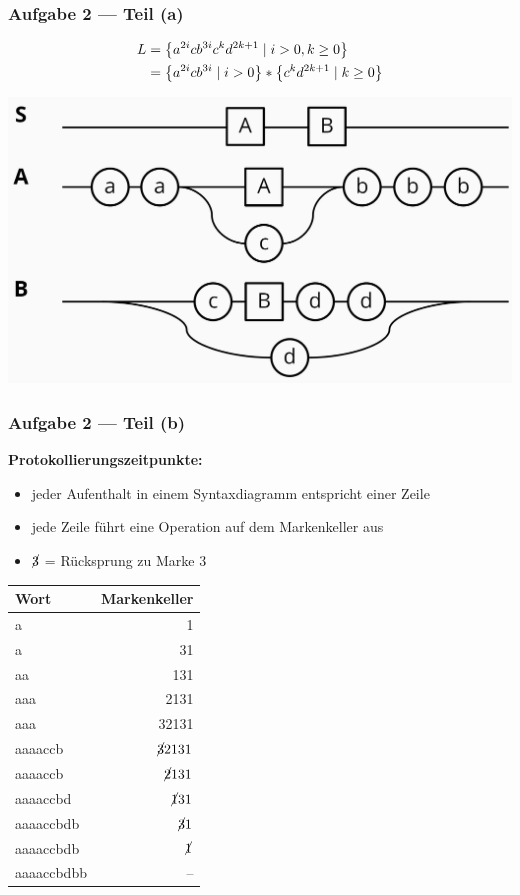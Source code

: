 \documentclass{beamer}
\begin{document}
\begin{frame} \frametitle{Aufgabe 2 --- Teil (a)}
	\begin{align*}
		L &= \left\{ a^{2i} c b^{3i} c^k d^{2k+1} \mid i > 0, k \ge 0 \right\} \\
		&= \left\{ a^{2i} c b^{3i} \mid i > 0 \right\} * \left\{ c^k d^{2k+1} \mid k \ge 0 \right\}
	\end{align*}
	
	\centering
	\includegraphics[width=.9\textwidth]{tut02_syntax_dia_2a.jpg}
\end{frame}

\begin{frame} \frametitle{Aufgabe 2 --- Teil (b)}
	\begin{minipage}{\dimexpr0.5\linewidth-\fboxrule-\fboxsep}
		\small
		\textbf{Protokollierungszeitpunkte:}
		\begin{itemize}
			\item jeder Aufenthalt in einem Syntaxdiagramm entspricht einer Zeile
			\item jede Zeile führt eine Operation auf dem Markenkeller aus
			\item $\cancel{3}$ = Rücksprung zu Marke $3$
		\end{itemize}
	\end{minipage}
	\pause
	\begin{minipage}{\dimexpr0.5\linewidth-\fboxrule-\fboxsep}
		\centering
		\begin{tabular}{l|r}
			\hline
			Wort & Markenkeller \\ \hline \pause
			a & 1 \\ \pause
			a & 31 \\ \pause
			aa & 131 \\ \pause
			aaa & 2131 \\ \pause
			aaa & 32131 \\ \pause
			aaaaccb & $\cancel{3} 2131$ \\ \pause
			aaaaccb & $\cancel{2}131$ \\ \pause
			aaaaccbd & $\cancel{1}31$ \\ \pause
			aaaaccbdb & $\cancel{3}1$ \\ \pause
			aaaaccbdb & $\cancel{1}$ \\ \pause
			aaaaccbdbb & -- \\ \hline
		\end{tabular}
	\end{minipage}

\end{frame}
\end{document}
